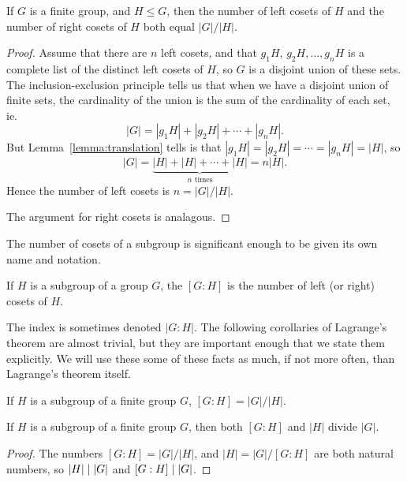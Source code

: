\begin{theorem}[Lagrange]\label{thm:lagrange}
  If $G$ is a finite group, and $H \le G$, then the number of left
  cosets of $H$ and the number of right cosets of $H$ both equal
  $|G|/|H|$.
\end{theorem}
\begin{proof}
  Assume that there are $n$ left cosets, and that $g_{1}H$, $g_{2}H,
  \ldots, g_{n}H$ is a complete list of the distinct left cosets of
  $H$, so $G$ is a disjoint union of these sets.  The
  inclusion-exclusion principle tells us that when we have a disjoint
  union of finite sets, the cardinality of the union is the sum of the
  cardinality of each set, ie.
  \[
    |G| = |g_{1}H| + |g_{2}H| + \cdots + |g_{n}H|.
  \]
  But Lemma~\ref{lemma:translation} tells is that $|g_{1}H| = 
  |g_{2}H| = \cdots = |g_{n}H| = |H|$, so
  \[
    |G| = \underbrace{|H| + |H| + \cdots + |H|}_{\text{$n$ times}} = 
    n|H|.
  \]
  Hence the number of left cosets is $n = |G|/|H|$.
  
  The argument for right cosets is analagous.
\end{proof}

The number of cosets of a subgroup is significant enough to be given 
its own name and notation.

\begin{definition}
  If $H$ is a subgroup of a group $G$, the  $[G : H]$ is the number of left (or right) cosets of $H$.
\end{definition}

The index is sometimes denoted $|G : H|$.  The following corollaries
of Lagrange's theorem are almost trivial, but they are important
enough that we state them explicitly.  We will use these some of these
facts as much, if not more often, than Lagrange's theorem itself.

\begin{corollary}
  If $H$ is a subgroup of a finite group $G$, $[G : H] = |G|/|H|$.
\end{corollary}

\begin{corollary}
  If $H$ is a subgroup of a finite group $G$, then both $[G : H]$ and 
  $|H|$ divide $|G|$.
\end{corollary}
\begin{proof}
  The numbers $[G : H] = |G|/|H|$, and $|H| = |G|/[G:H]$ are both
  natural numbers, so $|H| \mid |G|$ and $[G : H] \mid |G|$.
\end{proof}

